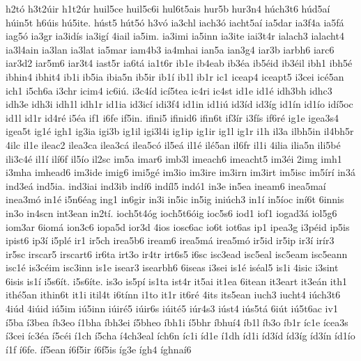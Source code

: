 {h2t^^f3
h3t2^^fair
h1t2^^far
huil5ce
huil5c6i
hul6t5ais
hur5b
hur3n4
h^^fach3t6
h^^fad5a^^ed
h^^fain5t
h6^^fais
h^^fa5ite.
h^^fast5
h^^fat5^^f3
h3v^^f3
ia3chl
iach3^^f3
iacht5a^^ed
ia5dar
ia3f4a
ia5f^^e1
iag5^^f3
ia3gr
ia3id^^eds
ia3ig^^ed
4iail
ia5im.
ia3imi
ia5inn
ia3ite
iai3t4r
ialach3
ialacht4
ia3l4ain
ia3lan
ia3lat
ia5mar
iam4b3
ia4mhai
ian5a
ian3g4
iar3b
iarbh6
iarc6
iar3d2
iar5m6
iar3t4
iast5r
ia6t^^e1
ia1t6r
ib1e
ib4eab
ib3^^e9a
ib5^^e9id
ib3^^e9il
ibh1
ibh5^^e9
ibhin4
ibhit4
ib1i
ib5ia
ibia5n
ib5ir
ib1^^ed
ib1l
ib1r
ic1
iceap4
iceapt5
i3cei
ic^^e95an
ich1
i5ch6a
i3chr
icim4
ic6i^^fa.
i3c4^^edd
ic^^ed5tea
ic4ri
ic4st
id1e
id1^^e9
idh3bh
idhc3
idh3e
idh3i
idh1l
idh1r
id1ia
id3ic^^ed
idi3f4
id1in
id1i^^fa
id3^^edd
id3^^edg
id1^^edn
id1^^edo
id^^ed5oc
id1l
id1r
id4r^^e9
i5^^e9a
if1
i6fe
if5in.
ifini5
ifinid6
ifin6t
if3^^edr
i3f^^eds
if6r^^e9
ig1e
igea3s4
igea5t
ig1^^e9
igh1
ig3ia
igi3b
ig1il
igi3l4i
ig1ip
ig1ir
ig1l
ig1r
i1h
il3a
ilbh5in
il4bh5r
4ilc
il1e
ileac2
ilea3ca
ilea3c^^e1
ilea5c^^f3
il5e^^e1
il1^^e9
il^^e95an
il6fr
il1i
4ilia
ilia5n
ili5b^^e9
ili3c4^^e9
il1^^ed
il^^ed6f
il5^^edo
il2sc
im5a
imar6
imb3l
imeach6
imeacht5
im3^^e9i
2img
imh1
i3mha
imhead6
im3ide
imig6
imi5g^^e9
im3io
im3ire
im3irn
im3irt
im5isc
im5^^edr^^ed
in3^^e1
ind3e^^e1
ind5ia.
ind3iai
ind3ib
ind^^ed6
ind^^edl5
ind^^f31
in3e
in5ea
ineam6
inea5ma^^ed
inea3m^^f3
in1^^e9
i5n6^^e9ag
ing1
in6gir
in3i
in5ic
in5ig
ini^^fach3
in1^^ed
in5^^edoc
in^^ed6t
6innis
in3o
in4scn
int3ean
in2t^^ed.
ioch5t4^^f3g
ioch5t6^^f3ig
ioc5s6
iod1
iof1
iogad3^^e1
iol5g6
iom3ar
6iom^^e1
ion3c6
iopa5d
ior3d
4ios
iosc6ac
io6t
iot6as
ip1
ipea3g
i3p^^e9id
ip5is
ipist6
ip3^^ed
i5pl^^e9
ir1
ir5ch
irea5b6
iream6
irea5m^^e1
irea5m^^f3
ir5id
ir5ip
ir3^^ed
ir^^edr3
ir5sc
irscar5
irscart6
ir6ta
irt3o
ir4tr
irt6s5
i6sc
isc3ead
isc5eal
isc5eam
isc5eann
isc1^^e9
is3c^^e9im
isc3inn
is1e
isear3
isearbh6
6iseas
i3sei
is1^^e9
is^^e9al5
is1i
4isic
i3sint
6isis
is1^^ed
i5s6^^edt.
i5s6^^edte.
is3o
is5p^^ed
is1ta
ist4r
it5ai
it1ea
6itean
it3eart
it3e^^e1n
ith1
ith^^e95an
ithin6t
it1i
itil4t
i6t^^ednn
i1to
it1r
it6r^^e9
4its
its5ean
iuch3
iucht4
i^^fach3t6
4i^^fad
4i^^faid
i^^fa5im
i^^fa5inn
i^^fair^^e95
i^^fair6s
i^^fait^^e95
i^^far4s3
i^^fast4
i^^fas5t^^e1
6i^^fat
i^^fa5t6ac
iv1
^^ed5ba
^^ed3bea
^^edb3eo
^^ed1bha
^^edbh3ei
^^ed5bheo
^^edbh1i
^^ed5bhr
^^edbhu^^ed4
^^edb1l
^^edb3o
^^edb1r
^^edc1e
^^edcea3s
^^ed3cei
^^edc3^^e9a
^^ed5c^^e9i
^^ed1ch
^^ed5cha
^^ed4ch3eal
^^edch6n
^^edc1i
^^edd1e
^^ed1dh
^^edd1i
^^edd3^^edd
^^edd3^^edg
^^edd3^^edn
^^edd1^^edo
^^ed1f
^^ed6fe.
^^edf5ean
^^ed6f5ir
^^ed6f5is
^^edg3e
^^edgh4
^^edghna^^ed6
}
